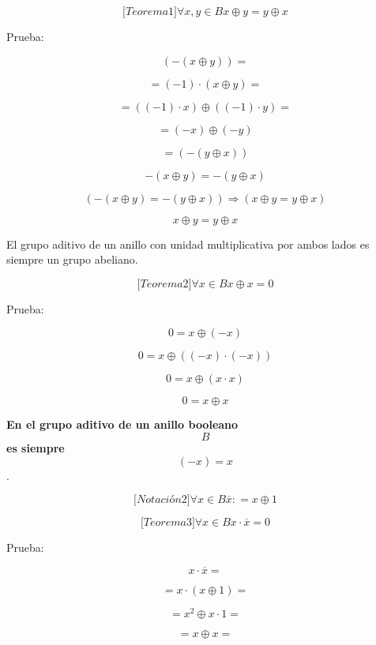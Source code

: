 \documentclass[
]{article}
\begin{document}
\begin{enumerate}
\begin{enumerate}
\begin{enumerate}
      \[{\lbrack{{Teorema}1}\rbrack}\forall x,{y \in B}x \oplus {y = y} \oplus x\]

      Prueba:

      \[\left( {- \left( {x \oplus y} \right)} \right) =\]

      \[{= {\left( {- 1} \right) \cdot \left( {x \oplus y} \right)}} =\]

      \[{= \left( {\left( {- 1} \right) \cdot x} \right)} \oplus {\left( {\left( {- 1} \right) \cdot y} \right) =}\]

      \[{= \left( {- x} \right)} \oplus \left( {- y} \right)\]

      \[= \left( {- \left( {y \oplus x} \right)} \right)\]

      \[{- \left( {x \oplus y} \right)} = {- \left( {y \oplus x} \right)}\]

      \[\left( {{- \left( {x \oplus y} \right)} = {- \left( {y \oplus x} \right)}} \right)\Rightarrow\left( {x \oplus {y = y} \oplus x} \right)\]

      \[x \oplus {y = y} \oplus x\]

      El grupo aditivo de un anillo con unidad multiplicativa por ambos
      lados es siempre un grupo abeliano.

      \[{\lbrack{{Teorema}2}\rbrack}\forall{x \in B}x \oplus {x = 0}\]

      Prueba:

      \[{0 = x} \oplus \left( {- x} \right)\]

      \[{0 = x} \oplus \left( {\left( {- x} \right) \cdot \left( {- x} \right)} \right)\]

      \[{0 = x} \oplus \left( {x \cdot x} \right)\]

      \[{0 = x} \oplus x\]

      \textbf{En el grupo aditivo de un anillo booleano
      }\emph{\[B\]}\textbf{ es siempre
      }\emph{\[\left( {- x} \right) = x\]}.

      \[{\lbrack{{Notación}2}\rbrack}\forall{x \in B}\overline{x}{: = x} \oplus 1\]

      \[{\lbrack{{Teorema}3}\rbrack}\forall{x \in B}{{x \cdot \overline{x}} = 0}\]

      Prueba:

      \[{x \cdot \overline{x}} =\]

      \[{= {x \cdot \left( {x \oplus 1} \right)}} =\]

      \[{= {x^{2} \oplus {x \cdot 1}}} =\]

      \[{= {x \oplus x}} =\]


\end{enumerate}
\end{enumerate}
\end{enumerate}
\end{document}
